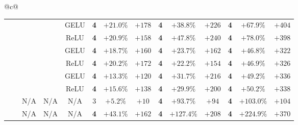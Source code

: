 \begin{tabular}{@{}c@{}}
\begin{tabular}{@{}ccccc|ccccccccc@{}}
\hdashline[1pt/3pt]
\cmark & \cmark & \xmark & \cmark & GELU & \textbf{4} & \textcolor{green!55!black}{$+21.0\%$} & \textcolor{green!55!black}{$+178$} & \textbf{4} & \textcolor{green!55!black}{$+38.8\%$} & \textcolor{green!55!black}{$+226$} & \textbf{4} & \textcolor{green!55!black}{$+67.9\%$} & \textcolor{green!55!black}{$+404$} \\
\cmark & \cmark & \xmark & \cmark & ReLU & \textbf{4} & \textcolor{green!55!black}{$+20.9\%$} & \textcolor{green!55!black}{$+158$} & \textbf{4} & \textcolor{green!55!black}{$+47.8\%$} & \textcolor{green!55!black}{$+240$} & \textbf{4} & \textcolor{green!55!black}{$+78.0\%$} & \textcolor{green!55!black}{$+398$} \\
\hdashline[1pt/3pt]
\cmark & \cmark & \cmark & \xmark & GELU & \textbf{4} & \textcolor{green!55!black}{$+18.7\%$} & \textcolor{green!55!black}{$+160$} & \textbf{4} & \textcolor{green!55!black}{$+23.7\%$} & \textcolor{green!55!black}{$+162$} & \textbf{4} & \textcolor{green!55!black}{$+46.8\%$} & \textcolor{green!55!black}{$+322$} \\
\cmark & \cmark & \cmark & \xmark & ReLU & \textbf{4} & \textcolor{green!55!black}{$+20.2\%$} & \textcolor{green!55!black}{$+172$} & \textbf{4} & \textcolor{green!55!black}{$+22.2\%$} & \textcolor{green!55!black}{$+154$} & \textbf{4} & \textcolor{green!55!black}{$+46.9\%$} & \textcolor{green!55!black}{$+326$} \\
\hdashline[1pt/3pt]
\cmark & \cmark & \cmark & \cmark & GELU & \textbf{4} & \textcolor{green!55!black}{$+13.3\%$} & \textcolor{green!55!black}{$+120$} & \textbf{4} & \textcolor{green!55!black}{$+31.7\%$} & \textcolor{green!55!black}{$+216$} & \textbf{4} & \textcolor{green!55!black}{$+49.2\%$} & \textcolor{green!55!black}{$+336$} \\
\cmark & \cmark & \cmark & \cmark & ReLU & \textbf{4} & \textcolor{green!55!black}{$+15.6\%$} & \textcolor{green!55!black}{$+138$} & \textbf{4} & \textcolor{green!55!black}{$+29.9\%$} & \textcolor{green!55!black}{$+200$} & \textbf{4} & \textcolor{green!55!black}{$+50.2\%$} & \textcolor{green!55!black}{$+338$} \\
\midrule
\xmark & \xmark & N/A & N/A & N/A & 3 & \textcolor{green!55!black}{$+5.2\%$} & \textcolor{green!55!black}{$+10$} & \textbf{4} & \textcolor{green!55!black}{$+93.7\%$} & \textcolor{green!55!black}{$+94$} & \textbf{4} & \textcolor{green!55!black}{$+103.0\%$} & \textcolor{green!55!black}{$+104$} \\
\cmark & \xmark & N/A & N/A & N/A & \textbf{4} & \textcolor{green!55!black}{$+43.1\%$} & \textcolor{green!55!black}{$+162$} & \textbf{4} & \textcolor{green!55!black}{$+127.4\%$} & \textcolor{green!55!black}{$+208$} & \textbf{4} & \textcolor{green!55!black}{$+224.9\%$} & \textcolor{green!55!black}{$+370$} \\

\end{tabular}
\end{tabular}
